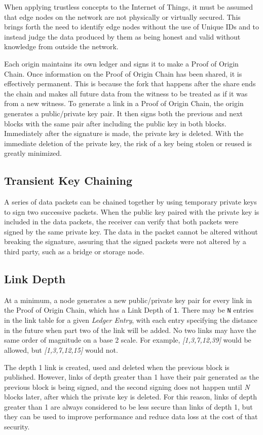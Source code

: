\documentclass{article}
\begin{document}
When applying trustless concepts to the Internet of Things, it must be assumed that edge nodes on the network are not physically or virtually secured. This brings forth the need to identify edge nodes without the use of Unique IDs and to instead judge the data produced by them as being honest and valid without knowledge from outside the network.

Each origin maintains its own ledger and signs it to make a Proof of Origin Chain. Once information on the Proof of Origin Chain has been shared, it is effectively permanent. This is because the fork that happens after the share ends the chain and makes all future data from the witness to be treated as if it was from a new witness. To generate a link in a Proof of Origin Chain, the origin generates a public/private key pair. It then signs both the previous and next blocks with the same pair after including the public key in both blocks. Immediately after the signature is made, the private key is deleted. With the immediate deletion of the private key, the risk of a key being stolen or reused is greatly minimized.

\subsection {Transient Key Chaining}
A series of data packets can be chained together by using temporary private keys to sign two successive packets. When the public key paired with the private key is included in the data packets, the receiver can verify that both packets were signed by the same private key. The data in the packet cannot be altered without breaking the signature, assuring that the signed packets were not altered by a third party, such as a \gls{bridge} or storage node.

\subsection {Link Depth}
At a minimum, a node generates a new public/private key pair for every link in the Proof of Origin Chain, which has a Link Depth of \texttt{1}. There may be \texttt{N} entries in the link table for a given \textit{Ledger Entry}, with each entry specifying the distance in the future when part two of the link will be added. No two links may have the same order of magnitude on a base 2 scale. For example, \textit{[1,3,7,12,39]} would be allowed, but \textit{[1,3,7,12,15]} would not.

The depth 1 link is created, used and deleted when the previous block is published. However, links of depth greater than 1 have their pair generated as the previous block is being signed, and the second signing does not happen until \textit{N} blocks later, after which the private key is deleted. For this reason, links of depth greater than 1 are always considered to be less secure than links of depth 1, but they can be used to improve performance and reduce data loss at the cost of that security.
\end{document}
